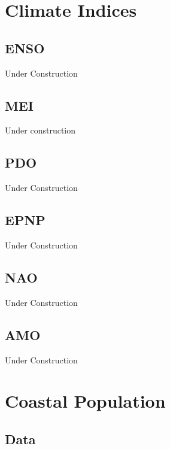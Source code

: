 \documentclass[
]{book}
\begin{document}
\hypertarget{climate-indices}{%
\chapter{Climate Indices}\label{climate-indices}}

\hypertarget{enso}{%
\section{ENSO}\label{enso}}

Under Construction

\hypertarget{mei}{%
\section{MEI}\label{mei}}

Under construction

\hypertarget{pdo}{%
\section{PDO}\label{pdo}}

Under Construction

\hypertarget{epnp}{%
\section{EPNP}\label{epnp}}

Under Construction

\hypertarget{nao}{%
\section{NAO}\label{nao}}

Under Construction

\hypertarget{amo}{%
\section{AMO}\label{amo}}

Under Construction

\hypertarget{coastal-population}{%
\chapter{Coastal Population}\label{coastal-population}}

\hypertarget{data-11}{%
\section{Data}\label{data-11}}
\end{document}
